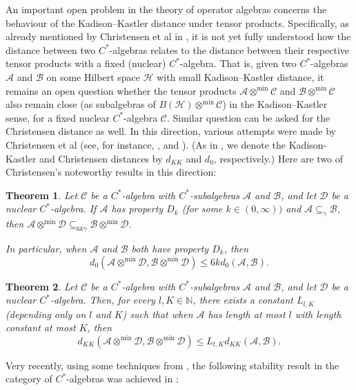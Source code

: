 \documentclass{amsart}
\numberwithin{equation}{section}
\newcommand{\mcal}{\mathcal}
\newcommand{\mbb}{\mathbb}
\newcommand{\1}{\mathbf{1}}
\newcommand{\mA}{\mathcal{A}}
\newcommand{\mB}{\mathcal{B}}
\newcommand{\mC}{\mathcal{C}}
\newcommand{\mD}{\mathcal{D}}
\newtheorem{theorem}{Theorem}[section]
\begin{document}
An important open problem in the theory of operator algebras concerns
the behaviour of the Kadison–Kastler distance under tensor
products. Specifically, as already mentioned by Christensen et al in
\cite{Ch3}, it is not yet fully understood how the distance between
two $C^*$-algebras relates to the distance between their respective
tensor products with a fixed (nuclear) $C^*$-algebra. That is, given
two $C^*$-algebras $\mathcal{A}$ and $\mathcal{B}$ on some Hilbert
space $\mcal{H}$ with small Kadison–Kastler distance, it remains an
open question whether the tensor products $\mathcal{A} \otimes^{\min}
\mathcal{C}$ and $\mathcal{B} \otimes^{\min} \mathcal{C}$ also remain
close (as subalgebras of $B(\mcal{H})\otimes^{\min} \mcal{C}$) in the
Kadison–Kastler sense, for a fixed nuclear $C^*$-algebra
$\mathcal{C}$. Similar question can be asked for the Christensen
distance as well. In this direction, various attempts were made by
Christensen et al (see, for instance, \cite{Ch1}, \cite{Ch2} and
\cite{Ch3}). (As in \cite{GK, GK2}, we denote the Kadison-Kastler and
Christensen distances by $d_{KK}$ and $d_0$, respectively.) Here are
two of Christensen's noteworthy results in this direction:

\begin{theorem}\cite[Theorem 3.1]{Ch1}\label{Ch1-6kd}
Let $\mC$ be a $C^*$-algebra with $C^*$-subalgebras $\mA$ and $\mB$,
and let $\mD$ be a nuclear $C^*$-algebra. If $\mA$ has property
$D_{k}$ (for some $k\in (0, \infty))$ and $\mA \subseteq_{\gamma}
\mB$, then $\mA \otimes^{\min} \mD \subseteq_{6k\gamma} \mB\otimes^{\min}
\mD$.

In particular, when $\mA$ and $\mB$ both have property $D_{k}$, then
\[
d_{0}(\mA \otimes^{\min} \mD, \mB \otimes^{\min} \mD)\leq 6k d_{0}(\mA,\mB).
\]
\end{theorem}

\begin{theorem}\cite[Corollary 4.7]{Ch3}
Let $\mC$ be a $C^*$-algebra with $C^*$-subalgebras $\mA$ and $\mB$,
and let $\mD$ be a nuclear $C^*$-algebra. Then, for every $l, K\in
\mbb{N}$, there exists a constant $L_{l,K}$ (depending only on $l$ and
$K$) such that when $\mA$ has length at most $l$ with length constant
at most $K$, then
\[
d_{KK}(\mA \otimes^{\min} \mD, \mB \otimes^{\min} \mD)\leq L_{l,K}d_{KK}(\mA, \mB).
\] 

\end{theorem}

Very recently, using some techniques from \cite{Ch1}, the following
 stability result in the category of $C^*$-algebras was achieved in \cite{GK2}:
\end{document}
